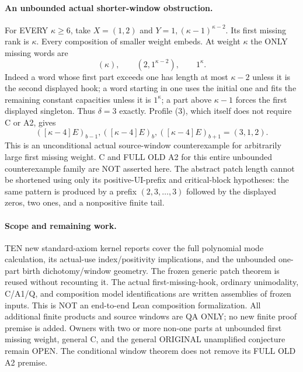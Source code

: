 \paragraph{An unbounded actual shorter-window obstruction.}
For EVERY $\kappa\ge6$, take $X=(1,2)$ and
$Y=1,(\kappa-1)^{\kappa-2}$. Its first missing rank is $\kappa$.
Every composition of smaller weight embeds. At weight $\kappa$
the ONLY missing words are
\[
 (\kappa),\qquad(2,1^{\kappa-2}),\qquad1^\kappa.
\]
Indeed a word whose first part exceeds one has length at most
$\kappa-2$ unless it is the second displayed hook; a word starting
in one uses the initial one and fits the remaining constant
capacities unless it is $1^\kappa$; a part above $\kappa-1$ forces
the first displayed singleton. Thus $\delta=3$ exactly.
Profile (3), which itself does not require C or A2, gives
\[
 ([\kappa-4]E)_{b-1},([\kappa-4]E)_b,
 ([\kappa-4]E)_{b+1}=(3,1,2).
\]
This is an unconditional actual source-window counterexample for
arbitrarily large first missing weight. C and FULL OLD A2 for this
entire unbounded counterexample family are NOT asserted here.
The abstract patch length cannot be shortened using only its
positive-UI-prefix and critical-block hypotheses: the same pattern
is produced by a prefix $(2,3,\ldots,3)$ followed by the displayed
zeros, two ones, and a nonpositive finite tail.

\paragraph{Scope and remaining work.}
TEN new standard-axiom kernel reports cover the full polynomial
mode calculation, its actual-use index/positivity implications,
and the unbounded one-part birth dichotomy/window geometry.
The frozen generic patch theorem is reused without recounting it.
The actual first-missing-hook, ordinary unimodality, C/A1/Q, and
composition model identifications are written assemblies of frozen
inputs. This is NOT an end-to-end Lean composition formalization.
All additional finite products and source windows are QA ONLY;
no new finite proof premise is added. Owners with two or more
non-one parts at unbounded first missing weight, general C, and
the general ORIGINAL unamplified conjecture remain OPEN. The
conditional window theorem does not remove its FULL OLD A2 premise.
